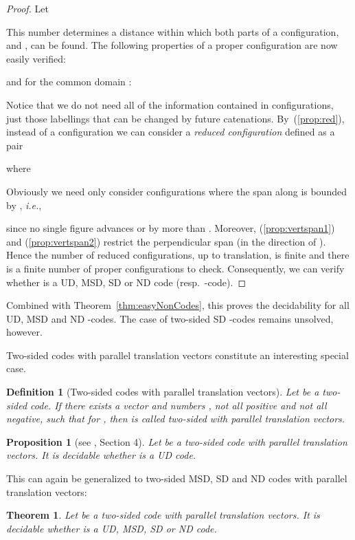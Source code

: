 \documentclass[final,nomarks]{dmtcs-episciences}
\newtheorem{definition}{Definition}
\newtheorem{theorem}{Theorem}
\newtheorem{proposition}{Proposition}
\begin{document}
\begin{proof}
Let

This number determines a distance within which both parts 
of a configuration,  and , can be found.
The following properties of a proper configuration  are now easily verified:

and for the common domain :


Notice that we do not need all of the information contained in
configurations, just those labellings that can be changed by
future catenations. By~(\ref{prop:red}), instead of a
configuration  we can consider a \emph{reduced configuration}
defined as a pair

where


Obviously we need only consider configurations where the span
along  is bounded by , \textit{i.e.},

since no single figure advances
 or  by more
than . Moreover, (\ref{prop:vertspan1}) and
(\ref{prop:vertspan2}) restrict the perpendicular span (in the
direction of ). Hence the number of
reduced configurations, up to translation, is finite and there
is a finite number of proper configurations to check.
Consequently, we can verify whether  is a UD, MSD, SD or ND
code (resp.\ -code).
\end{proof}






Combined with Theorem~\ref{thm:easyNonCodes}, this proves the
decidability for all UD, MSD and ND -codes. The case of two-sided SD
-codes remains unsolved, however.

Two-sided codes with parallel translation vectors constitute an interesting special case.

\begin{definition}[Two-sided codes with parallel translation vectors]
Let  be a two-sided code. If there exists
a vector  and numbers ,
not all positive and not all negative, such that
 for ,
then  is called \emph{two-sided with parallel translation vectors}.
\end{definition}


\begin{proposition}[see \cite{KolCOCOON}, Section 4]\label{prop:UDpar}
Let  be a two-sided code with parallel translation vectors. 
It is decidable whether  is a UD code.
\end{proposition}

This can again be generalized to two-sided MSD, SD and ND codes
with parallel translation vectors:

\begin{theorem}\label{th:line}
Let  be a two-sided code with parallel translation vectors. 
It is decidable whether  is a UD, MSD, SD or ND code.
\end{theorem}
\end{document}
